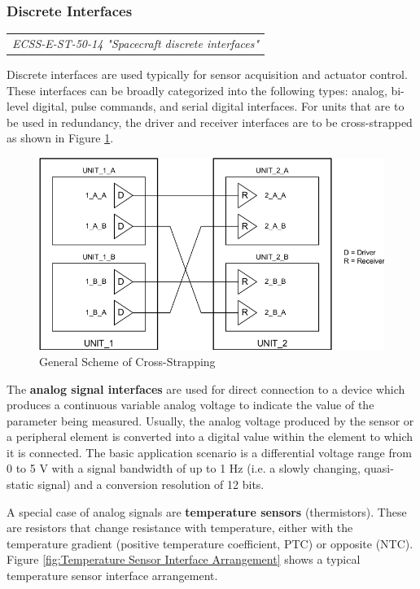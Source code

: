 \subsubsection{Discrete Interfaces}

\begin{tabular}{l}
\textit{ECSS-E-ST-50-14 "Spacecraft discrete interfaces" \cite{ECSS-E-ST-50-14}} \\
\end{tabular}

Discrete interfaces are used typically for sensor acquisition and actuator control. These interfaces can be broadly categorized into the following types: analog, bi-level digital, pulse commands, and serial digital interfaces. For units that are to be used in redundancy, the driver and receiver interfaces are to be cross-strapped as shown in Figure \ref{fig:General Scheme of Cross-Strapping}.

\begin{figure}[h]
\centering\includegraphics[scale=0.4]{fig/general_scheme_of_cross_strapping}
\caption{General Scheme of Cross-Strapping}
\label{fig:General Scheme of Cross-Strapping}
\end{figure}

The \textbf{analog signal interfaces} are used for direct connection to a device which produces a continuous variable analog voltage to indicate the value of the parameter being measured. Usually, the analog voltage produced by the sensor or a peripheral element is converted into a digital value within the element to which it is connected. The basic application scenario is a differential voltage range from 0 to 5 V with a signal bandwidth of up to 1 Hz (i.e. a slowly changing, quasi-static signal) and a conversion resolution of 12 bits.

A special case of analog signals are \textbf{temperature sensors} (thermistors). These are resistors that change resistance with temperature, either with the temperature gradient (positive temperature coefficient, PTC) or opposite (NTC). Figure \ref{fig:Temperature Sensor Interface Arrangement} shows a typical temperature sensor interface arrangement.

